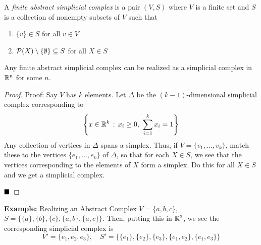 \begin{definition}
    A \emph{finite abstract simplicial complex} is a pair $(V, S)$ where $V$ is a finite set and $S$ is a collection of nonempty subsets of $V$ such that
    \begin{enumerate}[label = (\roman*)]
        \item $\{v\} \in S$ for all $v \in V$
        \item $\P(X) \setminus \{\emptyset\} \subseteq S$ for all $X \in S$
    \end{enumerate}
\end{definition}

\begin{lemma}
    Any finite abstract simplicial complex can be realized as a simplicial complex in $\R^n$ for some $n$.
\end{lemma}
\begin{proof}{Proof:}
    Say $V$ has $k$ elements. Let $\Delta$ be the $(k - 1)$-dimensional simplicial complex corresponding to
    \[ \left\{x \in \R^k \col x_i \geq 0,\ \sum_{i = 1}^{k} x_i = 1\right\} \]
    Any collection of vertices in $\Delta$ spans a simplex. Thus, if $V = \{v_1, \ldots, v_k\}$, match these to the vertices $\{e_1, \ldots, e_k\}$ of $\Delta$, so that for each $X \in S$, we see that the vertices corresponding to the elements of $X$ form a simplex. Do this for all $X \in S$ and we get a simplicial complex.

    $\qed$
\end{proof}

\begin{example}{\textbf{Example:} Realizing an Abstract Complex}
    $V = \{a, b, c\}$, $S = \{\{a\}, \{b\}, \{c\}, \{a, b\}, \{a, c\}\}$. Then, putting this in $\R^3$, we see the corresponding simplicial complex is
    \[ V' = \{e_1, e_2, e_3\}, \quad S' = \{\{e_1\}, \{e_2\}, \{e_3\}, \{e_1, e_2\}, \{e_1, e_3\}\} \]
\end{example}
